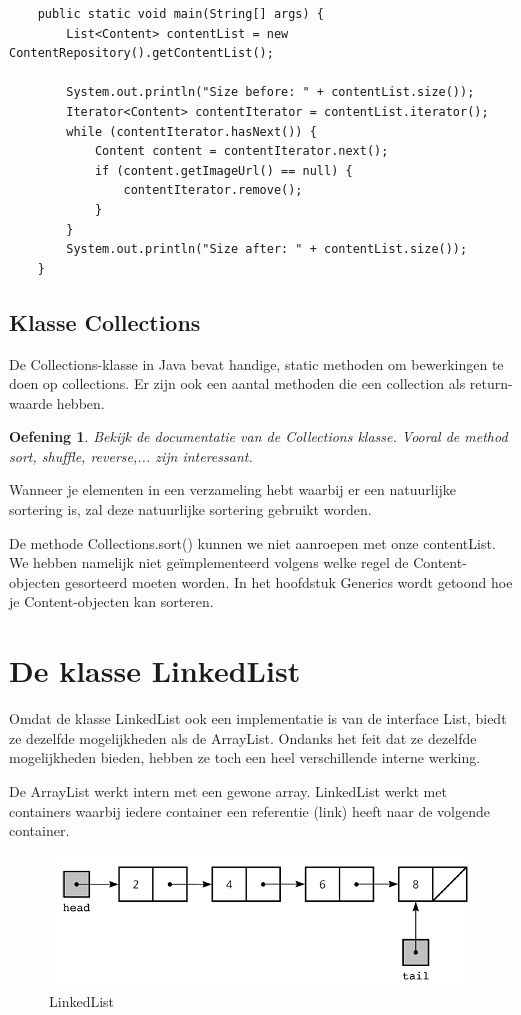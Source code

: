 \documentclass{tstextbook}
\newtheorem{envoefening}{Oefening}[chapter]
\newenvironment{oefening}
               {\begin{boxexercise}\begin{envoefening}}
               {\end{envoefening}\end{boxexercise}}
\begin{document}
\begin{lstlisting}
	public static void main(String[] args) {
		List<Content> contentList = new ContentRepository().getContentList();

		System.out.println("Size before: " + contentList.size());
		Iterator<Content> contentIterator = contentList.iterator();
		while (contentIterator.hasNext()) {
			Content content = contentIterator.next();
			if (content.getImageUrl() == null) {
				contentIterator.remove();
			}
		}
		System.out.println("Size after: " + contentList.size());
	}
\end{lstlisting}

\subsection{Klasse Collection\textbf{s}}

De Collections-klasse in Java bevat handige, static methoden om bewerkingen te doen op collections. Er zijn ook een aantal methoden die een collection als return-waarde hebben. 

\begin{oefening}
Bekijk de documentatie van de Collections klasse. Vooral de method sort, shuffle, reverse,... zijn interessant.
\end{oefening}

Wanneer je elementen in een verzameling hebt waarbij er een natuurlijke sortering is, zal deze natuurlijke sortering gebruikt worden.

De methode Collections.sort() kunnen we niet aanroepen met onze contentList. We hebben namelijk niet ge\"implementeerd volgens welke regel de Content-objecten gesorteerd moeten worden.
In het hoofdstuk Generics wordt getoond hoe je Content-objecten kan sorteren.

\section{De klasse LinkedList}

Omdat de klasse LinkedList ook een implementatie is van de interface List, biedt ze dezelfde mogelijkheden als de ArrayList.
Ondanks het feit dat ze dezelfde mogelijkheden bieden, hebben ze toch een heel verschillende interne werking.

De ArrayList werkt intern met een gewone array. LinkedList werkt met containers waarbij iedere container een referentie (link) heeft naar de volgende container.

\begin{figure}[H]
\includegraphics[width=\linewidth]{images/h3/linkedlist-in-java.png}
\caption{LinkedList}
\label{fig:core_classes}
\end{figure}
 
\end{document}
